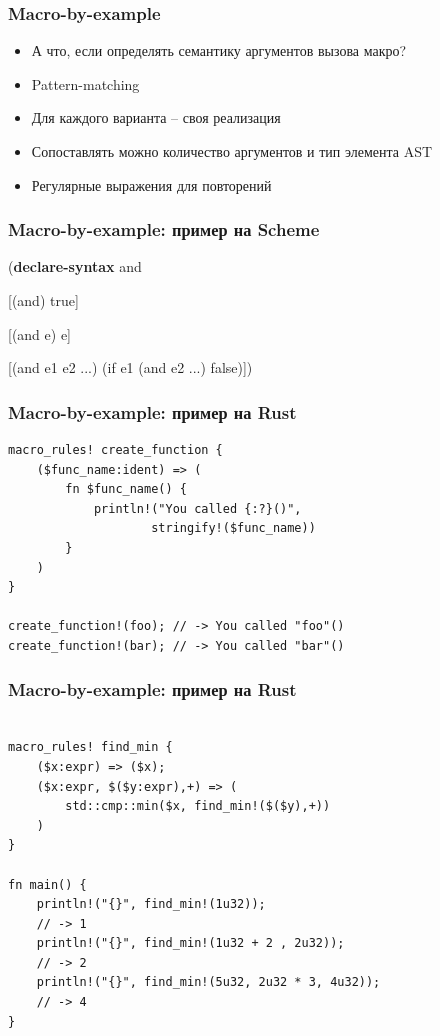 \documentclass[11pt]{beamer}
\begin{document}
\begin{frame}
\frametitle{Macro-by-example}

\begin{itemize}
\item А что, если определять семантику аргументов вызова макро?
\item Pattern-matching
\item Для каждого варианта -- своя реализация
\item Сопоставлять можно количество аргументов и тип элемента AST
\item Регулярные выражения для повторений
\end{itemize}

\end{frame}


\begin{frame}
\frametitle{Macro-by-example: пример на Scheme}

(\textbf{declare-syntax} and

	\hspace*{20pt}[(and) true]
	
	\hspace*{20pt}[(and e) e]
	
	\hspace*{20pt}[(and e1 e2 ...) (if e1 (and e2 ...) false)])

\end{frame}


\begin{frame}[fragile]
\frametitle{Macro-by-example: пример на Rust}

\begin{lstlisting}
macro_rules! create_function {
    ($func_name:ident) => (
        fn $func_name() {
            println!("You called {:?}()", 
            		stringify!($func_name))
        }
    )
}

create_function!(foo); // -> You called "foo"()
create_function!(bar); // -> You called "bar"()

\end{lstlisting}

\end{frame}


\begin{frame}[fragile]
\frametitle{Macro-by-example: пример на Rust}

\begin{lstlisting}

macro_rules! find_min {
    ($x:expr) => ($x);
    ($x:expr, $($y:expr),+) => (
        std::cmp::min($x, find_min!($($y),+))
    )
}

fn main() {
    println!("{}", find_min!(1u32));
    // -> 1
    println!("{}", find_min!(1u32 + 2 , 2u32)); 
    // -> 2
    println!("{}", find_min!(5u32, 2u32 * 3, 4u32)); 
    // -> 4
}

\end{lstlisting}

\end{frame}
\end{document}
